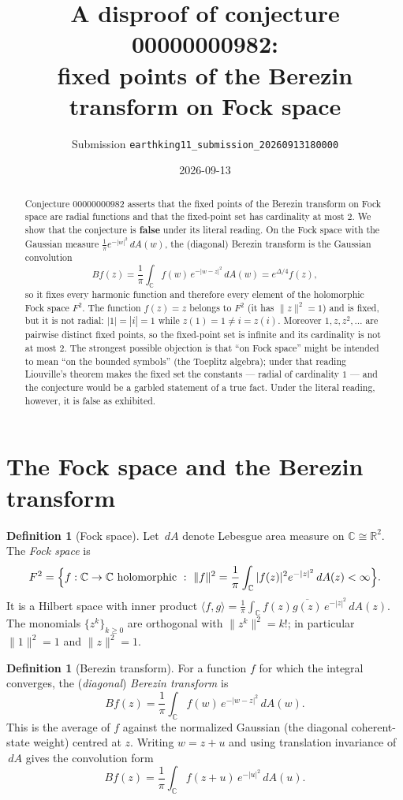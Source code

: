 \documentclass[11pt]{article}
\title{A disproof of conjecture 00000000982:\\
fixed points of the Berezin transform on Fock space}
\author{Submission \texttt{earthking11\_submission\_20260913180000}}
\date{2026-09-13}
\theoremstyle{definition}
\newtheorem{definition}[theorem]{Definition}
\newcommand{\dA}{\,dA}
\newcommand{\C}{\mathbb{C}}
\newcommand{\R}{\mathbb{R}}
\begin{document}
\maketitle

\begin{abstract}
Conjecture 00000000982 asserts that the fixed points of the Berezin transform
on Fock space are radial functions and that the fixed-point set has cardinality
at most $2$. We show that the conjecture is \textbf{false} under its literal
reading. On the Fock space with the Gaussian measure
$\frac1\pi e^{-|w|^2}\dA(w)$, the (diagonal) Berezin transform is the Gaussian
convolution
\[
  Bf(z)=\frac1\pi\int_\C f(w)\,e^{-|w-z|^2}\dA(w)=e^{\Delta/4}f(z),
\]
so it fixes every harmonic function and therefore every element of the
holomorphic Fock space $F^2$. The function $f(z)=z$ belongs to $F^2$ (it has
$\|z\|^2=1$) and is fixed, but it is not radial: $|1|=|i|=1$ while $z(1)=1\neq
i=z(i)$. Moreover $1,z,z^2,\dots$ are pairwise distinct fixed points, so the
fixed-point set is infinite and its cardinality is not at most $2$. The
strongest possible objection is that ``on Fock space'' might be intended to mean
``on the bounded symbols'' (the Toeplitz algebra); under that reading Liouville's
theorem makes the fixed set the constants --- radial of cardinality $1$ --- and
the conjecture would be a garbled statement of a true fact. Under the literal
reading, however, it is false as exhibited.
\end{abstract}

\section{The Fock space and the Berezin transform}

\begin{definition}[Fock space]
Let $\dA$ denote Lebesgue area measure on $\C\cong\R^2$. The \emph{Fock space}
is
\[
  F^2=\Bigl\{f:\C\to\C \text{ holomorphic} \ :\
  \|f\|^2=\frac1\pi\int_\C |f(z)|^2 e^{-|z|^2}\dA(z)<\infty\Bigr\}.
\]
It is a Hilbert space with inner product
$\langle f,g\rangle=\frac1\pi\int_\C f(z)\overline{g(z)}\,e^{-|z|^2}\dA(z)$.
The monomials $\{z^k\}_{k\ge0}$ are orthogonal with
$\|z^k\|^2=k!$; in particular $\|1\|^2=1$ and $\|z\|^2=1$.
\end{definition}

\begin{definition}[Berezin transform]\label{def:berezin}
For a function $f$ for which the integral converges, the (\emph{diagonal})
\emph{Berezin transform} is
\[
  Bf(z)=\frac1\pi\int_\C f(w)\,e^{-|w-z|^2}\dA(w).
\]
This is the average of $f$ against the normalized Gaussian (the diagonal
coherent-state weight) centred at $z$. Writing $w=z+u$ and using translation
invariance of $\dA$ gives the convolution form
\[
  Bf(z)=\frac1\pi\int_\C f(z+u)\,e^{-|u|^2}\dA(u).
\]
\end{definition}
\end{document}
